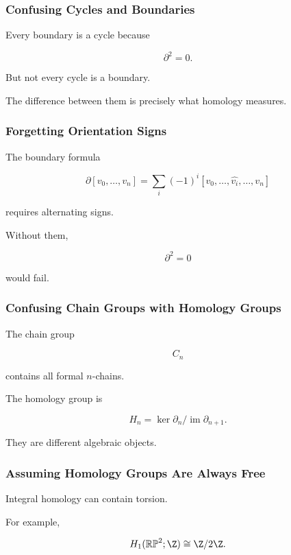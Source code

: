 \subsubsection{Confusing Cycles and Boundaries}

Every boundary is a cycle because

\[
\partial^2=0.
\]

But not every cycle is a boundary.

The difference between them is precisely what homology measures.

\subsubsection{Forgetting Orientation Signs}

The boundary formula

\[
\partial[v_0,\ldots,v_n]
=
\sum_i(-1)^i
[v_0,\ldots,\widehat{v_i},\ldots,v_n]
\]

requires alternating signs.

Without them,

\[
\partial^2=0
\]

would fail.

\subsubsection{Confusing Chain Groups with Homology Groups}

The chain group

\[
C_n
\]

contains all formal \(n\)-chains.

The homology group is

\[
\boxed{
H_n
=
\ker\partial_n/
\operatorname{im}\partial_{n+1}.
}
\]

They are different algebraic objects.

\subsubsection{Assuming Homology Groups Are Always Free}

Integral homology can contain torsion.

For example,

\[
H_1(\mathbb{RP}^2;\Z)
\cong
\Z/2\Z.
\]

